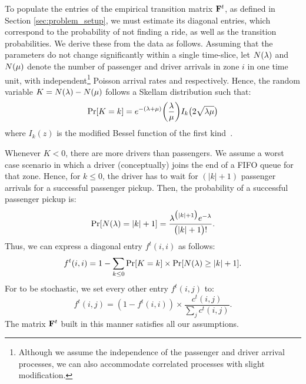 To populate the entries of the empirical transition matrix ${\mathbf{F}}^t$, as 
  defined in Section \ref{sec:problem_setup}, we must estimate its diagonal entries, 
  which correspond to the probability of not finding a ride, as well as the transition probabilities.
We derive these from the data as follows.
Assuming that the parameters do not change significantly within a single time-slice, let $N(\lambda)$ and $N(\mu)$ denote the number of passenger and driver arrivals in zone $i$ in one time unit, with 
independent\footnote{Although we assume the independence of the passenger and driver arrival processes, we can also accommodate correlated processes with slight modification.} Poisson arrival rates {\passengerarrivalrate} and {\driverarrivalrate} respectively. Hence, the random variable $K = N(\lambda) - N(\mu)$ follows a Skellam distribution
such that:
\begin{equation*}
\Pr[K=k] = e^{-(\lambda + \mu)} \bigg(\frac{\lambda}{\mu}\bigg) I_k\big(2 \sqrt{\lambda \mu}\big)
\end{equation*}
where $I_k(z)$ is the modified Bessel function of the first kind~\cite{wiki:skellam}. 

Whenever %
$K<0$, there are more drivers than passengers. We assume a worst case scenario in which a driver (conceptually) joins the end
 of a FIFO queue for that zone. Hence, for $k \leq 0$, the driver has to wait for $(|k| + 1)$ passenger arrivals for a successful passenger pickup. Then, the probability of a successful passenger pickup is:
\begin{equation*}
\Pr[N(\lambda) = |k| + 1] = \frac{\lambda^{\big(|k|+1\big)} e^{-\lambda}}{\big(|k| + 1\big)!}.
\end{equation*}
Thus, we can express a diagonal entry $f^t(i,i)$ as follows:
\begin{equation*}
f^t(i,i) = 1 - \sum_{k \leq 0} \Pr[K = k] \times \Pr[N(\lambda) \geq |k| + 1].
\end{equation*}
For {\empiricaltransitionmatrix} to be stochastic, we set every other entry 
$f^t(i,j)$ to:
\begin{equation*}
f^t(i,j) = (1 - f^t(i,i)) \times \frac{c^t(i,j)}{\sum_{j}c^t(i,j)}. 
\end{equation*}
The matrix ${\mathbf{F}}^t$ built in this manner satisfies all our assumptions. %

